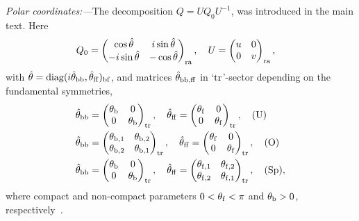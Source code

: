 \documentclass[twocolumn,showpacs,aps,prl]{revtex4}
\begin{document}
{\it Polar coordinates:---}The decomposition 
$Q=UQ_0U^{-1}$,
was introduced in the main text.
Here 
\begin{align}
&Q_0=\begin{pmatrix}
\cos\hat{\theta} & i\sin\hat{\theta} \\
-i\sin\hat{\theta}  & -\cos\hat{\theta} 
\end{pmatrix}_{\rm ra},
\quad
U=\begin{pmatrix}
u & 0 \\
0 & v
\end{pmatrix}_{\rm ra},
\end{align}
with 
$\hat{\theta}
={\rm diag}(i\hat{\theta}_{\rm bb}, \hat{\theta}_{\rm ff})_{\rm bf}$, 
and matrices $\hat{\theta}_{\rm bb,ff}$ in `${\rm tr}$'-sector 
depending on the fundamental symmetries,
\begin{align}
\hat{\theta}_{\rm bb}
&=
\begin{pmatrix}
\theta_{\rm b} & 0 \\
0 & \theta_{\rm b}
\end{pmatrix}_{\rm tr},
\quad
\hat{\theta}_{\rm ff}
=\begin{pmatrix}
\theta_{\rm f} & 0 \\
0 & \theta_{\rm f}
\end{pmatrix}_{\rm tr},
\quad ({\rm U})
\\
\hat{\theta}_{\rm bb}
&=
\begin{pmatrix}
\theta_{{\rm b},1} & \theta_{{\rm b},2} \\
\theta_{{\rm b},2} & \theta_{{\rm b},1}
\end{pmatrix}_{\rm tr},
\quad
\hat{\theta}_{\rm ff}
=\begin{pmatrix}
\theta_{\rm f} & 0 \\
0 & \theta_{\rm f}
\end{pmatrix}_{\rm tr},
\quad ({\rm O})
\\
\hat{\theta}_{\rm bb}
&=
\begin{pmatrix}
\theta_{\rm b} & 0 \\
0 & \theta_{\rm b}
\end{pmatrix}_{\rm tr},
\quad
\hat{\theta}_{\rm ff}
=\begin{pmatrix}
\theta_{{\rm f},1} & \theta_{{\rm f},2} \\
\theta_{{\rm f},2} & \theta_{{\rm f},1}
\end{pmatrix}_{\rm tr},
\quad ({\rm Sp}),
\end{align}
where compact and  
non-compact parameters $0<\theta_{\rm f} <\pi$ 
and
$\theta_{\rm b}>0$, respectively~\cite{SMEfetovBook}. 
\end{document}
